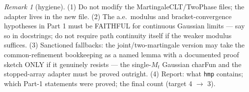 \documentclass[11pt]{article}
\theoremstyle{plain}
\theoremstyle{remark}
\newtheorem{remark}{Remark}
\begin{document}
\begin{remark}[hygiene]
(1) Do not modify the MartingaleCLT/TwoPhase files; the adapter lives in the
new file. (2) The a.e.\ modulus and bracket-convergence hypotheses in Part 1
must be FAITHFUL for continuous Gaussian limits --- say so in docstrings; do
not require path continuity itself if the weaker modulus suffices.
(3) Sanctioned fallbacks: the joint/two-martingale version may take the
common-refinement bookkeeping as a named lemma with a documented proof
sketch ONLY if it genuinely resists --- the single-$M_t$ Gaussian charFun
and the stopped-array adapter must be proved outright. (4) Report: what
\texttt{hmp} contains; which Part-1 statements were proved; the final count
(target 4 $\to$ 3).
\end{remark}
\end{document}
